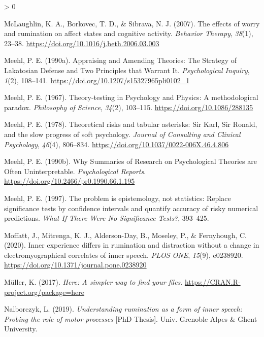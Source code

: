 \documentclass[
  english,
  man, donotrepeattitle,floatsintext]{apa6}
\newlength{\cslhangindent}
\newenvironment{CSLReferences}[2] %
 {%
  \setlength{\parindent}{0pt}
  \ifodd #1 \everypar{\setlength{\hangindent}{\cslhangindent}}\ignorespaces\fi
  \ifnum #2 > 0
  \setlength{\parskip}{#2\baselineskip}
  \fi
 }%
 {}
\begin{document}
\begin{CSLReferences}{1}{0}
\leavevmode\hypertarget{ref-mclaughlin_effects_2007}{}%
McLaughlin, K. A., Borkovec, T. D., \& Sibrava, N. J. (2007). The effects of worry and rumination on affect states and cognitive activity. \emph{Behavior Therapy}, \emph{38}(1), 23--38. \url{https://doi.org/10.1016/j.beth.2006.03.003}

\leavevmode\hypertarget{ref-meehl_appraising_1990-1}{}%
Meehl, P. E. (1990a). Appraising and {Amending Theories}: {The Strategy} of {Lakatosian Defense} and {Two Principles} that {Warrant It}. \emph{Psychological Inquiry}, \emph{1}(2), 108--141. \url{https://doi.org/10.1207/s15327965pli0102_1}

\leavevmode\hypertarget{ref-meehl_theory-testing_1967}{}%
Meehl, P. E. (1967). Theory-testing in {Psychology} and {Physics}: {A} methodological paradox. \emph{Philosophy of Science}, \emph{34}(2), 103--115. \url{https://doi.org/10.1086/288135}

\leavevmode\hypertarget{ref-meehl_theoretical_1978}{}%
Meehl, P. E. (1978). Theoretical risks and tabular asterisks: {Sir Karl}, {Sir Ronald}, and the slow progress of soft psychology. \emph{Journal of Consulting and Clinical Psychology}, \emph{46}(4), 806--834. \url{https://doi.org/10.1037/0022-006X.46.4.806}

\leavevmode\hypertarget{ref-meehl_why_1990}{}%
Meehl, P. E. (1990b). Why {Summaries} of {Research} on {Psychological Theories} are {Often Uninterpretable}. \emph{Psychological Reports}. \url{https://doi.org/10.2466/pr0.1990.66.1.195}

\leavevmode\hypertarget{ref-harlow_problem_1997}{}%
Meehl, P. E. (1997). The problem is epistemology, not statistics: {Replace} significance tests by confidence intervals and quantify accuracy of risky numerical predictions. \emph{What If There Were No Significance Tests?}, 393--425.

\leavevmode\hypertarget{ref-moffatt_inner_2020}{}%
Moffatt, J., Mitrenga, K. J., Alderson-Day, B., Moseley, P., \& Fernyhough, C. (2020). Inner experience differs in rumination and distraction without a change in electromyographical correlates of inner speech. \emph{PLOS ONE}, \emph{15}(9), e0238920. \url{https://doi.org/10.1371/journal.pone.0238920}

\leavevmode\hypertarget{ref-R-here}{}%
Müller, K. (2017). \emph{Here: A simpler way to find your files}. \url{https://CRAN.R-project.org/package=here}

\leavevmode\hypertarget{ref-nalborczyk_understanding_2019}{}%
Nalborczyk, L. (2019). \emph{Understanding rumination as a form of inner speech: Probing the role of motor processes} {[}PhD Thesis{]}. Univ. Grenoble Alpes \& Ghent University.


\end{CSLReferences}
\end{document}
